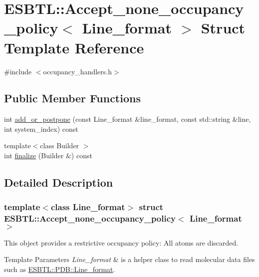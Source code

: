 \hypertarget{structESBTL_1_1Accept__none__occupancy__policy}{}\section{E\+S\+B\+TL\+:\+:Accept\+\_\+none\+\_\+occupancy\+\_\+policy$<$ Line\+\_\+format $>$ Struct Template Reference}
\label{structESBTL_1_1Accept__none__occupancy__policy}


{\ttfamily \#include $<$occupancy\+\_\+handlers.\+h$>$}

\subsection*{Public Member Functions}
\begin{DoxyCompactItemize}
\item 
int \hyperlink{structESBTL_1_1Accept__none__occupancy__policy_a344568f9ed2b6e715a7ec77df5cc7a06}{add\+\_\+or\+\_\+postpone} (const Line\+\_\+format \&line\+\_\+format, const std\+::string \&line, int system\+\_\+index) const
\item 
{\footnotesize template$<$class Builder $>$ }\\int \hyperlink{structESBTL_1_1Accept__none__occupancy__policy_a5be3403eef8217d1abace33347352550}{finalize} (Builder \&) const
\end{DoxyCompactItemize}


\subsection{Detailed Description}
\subsubsection*{template$<$class Line\+\_\+format$>$\newline
struct E\+S\+B\+T\+L\+::\+Accept\+\_\+none\+\_\+occupancy\+\_\+policy$<$ Line\+\_\+format $>$}

This object provides a restrictive occupancy policy\+: All atoms are discarded. 
\begin{DoxyTemplParams}{Template Parameters}
{\em Line\+\_\+format} & is a helper class to read molecular data files such as \hyperlink{classESBTL_1_1PDB_1_1Line__format}{E\+S\+B\+T\+L\+::\+P\+D\+B\+::\+Line\+\_\+format}. \\
\hline
\end{DoxyTemplParams}


